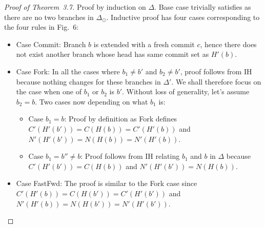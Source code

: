 \begin{proof}[Proof of Theorem~3.7]
  Proof by induction on $\Delta$. Base case trivially satisfies as
  there are no two branches in $\Delta_{\odot}$. Inductive proof has
  four cases corresponding to the four rules in
  Fig.~6:
  \begin{itemize}
    \item Case {\sc Commit}: Branch $b$ is extended with a fresh
      commit $c$, hence there does not exist another branch whose head
      has same commit set as $H'(b)$. 

    \item Case {\sc Fork}: In all the cases where $b_1 \neq b'$ and
      $b_2 \neq b'$, proof follows from IH because nothing changes for
      these branches in $\Delta'$. We shall therefore focus on the
      case when one of $b_1$ or $b_2$ is $b'$. Without loss of
      generality, let's assume $b_2 = b$. Two cases now depending on
      what $b_1$ is:
      \begin{itemize}
        \item  Case $b_1 = b$: Proof by definition as {\sc Fork}
          defines $C'(H'(b')) = C(H(b)) = C'(H'(b))$ and $N'(H'(b')) =
          N(H(b)) = N'(H'(b))$. 
        \item Case $b_1 = b'' \neq b$: Proof follows from IH relating
          $b_1$ and $b$ in $\Delta$ because $C'(H'(b')) = C(H(b))$ and $N'(H'(b')) =
          N(H(b))$.
      \end{itemize}

    \item Case {\sc FastFwd}: The proof is similar to the {\sc Fork}
      case since $C'(H'(b)) = C(H(b')) = C'(H'(b'))$ and $N'(H'(b)) =
      N(H(b')) = N'(H'(b'))$.


\end{itemize}
\end{proof}
